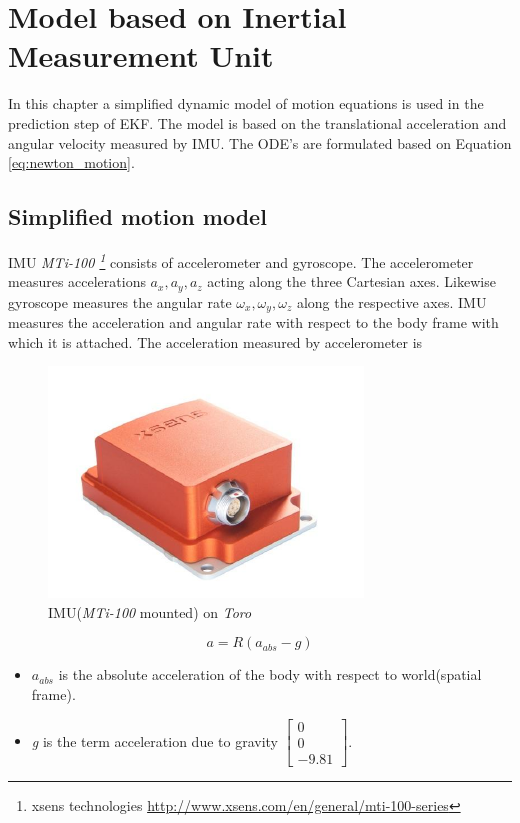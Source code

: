 \chapter{Model based on Inertial Measurement Unit}
\label{chap:simp_mdl}
In this chapter a simplified dynamic model of motion equations is used in the prediction step of EKF. The model is based on the translational acceleration and angular velocity measured by IMU. The ODE's are formulated based on Equation \ref{eq:newton_motion}.

\section{Simplified motion model}
IMU \emph{MTi-100 \footnote{xsens technologies \url{http://www.xsens.com/en/general/mti-100-series} }} consists of accelerometer and gyroscope. The accelerometer measures accelerations $a_x,a_y,a_z$ acting along the three Cartesian axes. Likewise gyroscope measures the angular rate $\omega_x,\omega_y,\omega_z$ along the respective axes. IMU measures the acceleration and angular rate with respect to the body frame with which it is attached. The acceleration measured by accelerometer is 
\begin{figure}
\begin{center}
\includegraphics[scale=0.75]{Bilder/pic_imu.png}
\caption{IMU(\emph{MTi-100} mounted) on \emph{Toro}}
\label{fig:toro_imu}
\end{center}
\end{figure}
\begin{equation}
    \label{eq:imu_acc}
    a = R(a_{abs} - g)
\end{equation}
\begin{itemize}
    \item $a_{abs} $ is the absolute acceleration of the body with respect to world(spatial frame).
    \item \emph{g} is the term acceleration due to gravity $\begin{bmatrix}0 \\ 0 \\ -9.81\end{bmatrix}$.
\end{itemize}
